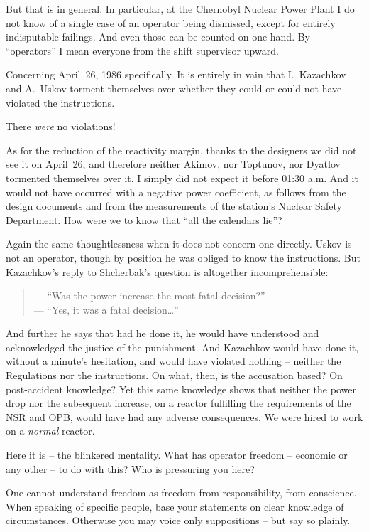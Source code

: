 \documentclass[openright]{bookest}
\begin{document}
But that is in general. In particular, at the Chernobyl Nuclear Power Plant I do not know of a single case of an operator being dismissed, except for entirely indisputable failings. And even those can be counted on one hand. By ``operators'' I mean everyone from the shift supervisor upward.

Concerning April~26, 1986 specifically. It is entirely in vain that I.~Kazachkov and A.~Uskov torment themselves over whether they could or could not have violated the instructions.

There \textit{were} no violations!

As for the reduction of the reactivity margin, thanks to the designers we did not see it on April~26, and therefore neither Akimov, nor Toptunov, nor Dyatlov tormented themselves over it. I simply did not expect it before 01:30 a.m. And it would not have occurred with a negative power coefficient, as follows from the design documents and from the measurements of the station's Nuclear Safety Department. How were we to know that ``all the calendars lie''?

Again the same thoughtlessness when it does not concern one directly. Uskov is not an operator, though by position he was obliged to know the instructions. But Kazachkov's reply to Shcherbak's question is altogether incomprehensible:
\begin{quote}
--- ``Was the power increase the most fatal decision?''\\
--- ``Yes, it was a fatal decision\ldots''
\end{quote}

And further he says that had he done it, he would have understood and acknowledged the justice of the punishment. And Kazachkov would have done it, without a minute's hesitation, and would have violated nothing -- neither the Regulations nor the instructions. On what, then, is the accusation based? On post-accident knowledge? Yet this same knowledge shows that neither the power drop nor the subsequent increase, on a reactor fulfilling the requirements of the NSR and OPB, would have had any adverse consequences. We were hired to work on a \textit{normal} reactor.

Here it is -- the blinkered mentality. What has operator freedom -- economic or any other -- to do with this? Who is pressuring you here?

One cannot understand freedom as freedom from responsibility, from conscience. When speaking of specific people, base your statements on clear knowledge of circumstances. Otherwise you may voice only suppositions -- but say so plainly.
\end{document}
